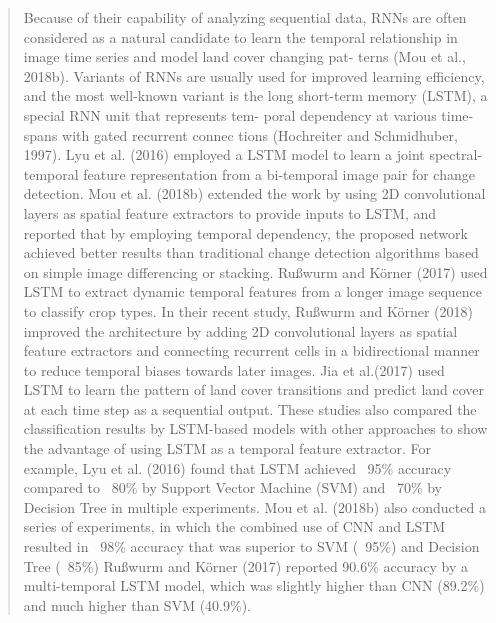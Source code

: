 \begin{quotation}
    Because of their capability of analyzing sequential data, RNNs are often considered as a natural candidate to learn the temporal relationship in image time series and model land cover changing pat-
    terns (Mou et al., 2018b). Variants of RNNs are usually used for improved learning efficiency, and the most well-known variant is the long short-term memory (LSTM), a special RNN unit that represents tem-
    poral dependency at various time-spans with gated recurrent connec    tions (Hochreiter and  Schmidhuber, 1997). Lyu et al. (2016) employed
    a LSTM model to learn a joint spectral-temporal feature representation from a bi-temporal image pair for change detection. Mou et al. (2018b) extended the work by using 2D convolutional layers as spatial feature extractors to provide inputs to LSTM, and reported that by employing temporal dependency, the proposed network achieved better results than traditional change detection algorithms based on simple image differencing or stacking. Rußwurm and Körner (2017) used LSTM to extract dynamic temporal features from a longer image sequence to classify crop types. In their recent study, Rußwurm and Körner (2018) improved the architecture by adding 2D convolutional layers as spatial feature extractors and connecting recurrent cells in a bidirectional
    manner to reduce temporal biases towards later images. Jia et al.(2017) used LSTM to learn the pattern of land cover transitions and predict land cover at each time step as a sequential output. These studies also compared the classification results by LSTM-based models with other approaches to show the advantage of using LSTM as a temporal feature extractor. For example, Lyu et al. (2016) found that
    LSTM achieved ~95\% accuracy compared to ~80\% by Support Vector Machine (SVM) and ~70\% by Decision Tree in multiple experiments. Mou et al. (2018b) also conducted a series of experiments, in which the
    combined use of CNN and LSTM resulted in ~98\% accuracy that was superior to SVM (~95\%) and Decision Tree (~85\%) Rußwurm and Körner (2017) reported 90.6\% accuracy by a multi-temporal LSTM
    model, which was slightly higher than CNN (89.2\%) and much higher than SVM (40.9\%).
\end{quotation}

